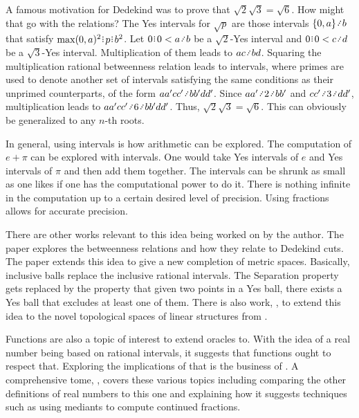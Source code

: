 \documentclass[12pt]{article}
\begin{document}
A famous motivation for Dedekind was to prove that $\sqrt{2} \sqrt{3} = \sqrt{6}$. How might that go with the relations? The Yes intervals for $\sqrt{p}$ are those intervals $\{0, a\} \lte b$ that satisfy $\max(0,a)^2 \rint  p \rint  b^2$. Let $0\rint 0 < a \lte b$ be a $\sqrt{2}$-Yes interval and $0\rint 0 < c\lte d$ be a $\sqrt{3}$-Yes interval. Multiplication of them leads to $ac \lte bd$. Squaring the multiplication rational betweenness relation leads to intervals, where primes are used to denote another set of intervals satisfying the same conditions as their unprimed counterparts,  of the form $aa' cc' \lte bb' dd'$. Since $aa' \lte 2 \lte bb'$ and $cc' \lte 3 \lte dd'$, multiplication leads to $aa' cc' \lte 6 \lte bb' dd'$. Thus, $\sqrt{2} \sqrt{3} = \sqrt{6}$. This can obviously be generalized to any $n$-th roots. 

In general, using intervals is how arithmetic can be explored. The computation of $e + \pi$ can be explored with intervals. One would take Yes intervals of $e$ and Yes intervals of $\pi$ and then add them together. The intervals can be shrunk as small as one likes if one has the computational power to do it. There is nothing infinite in the computation up to a certain desired level of precision. Using fractions allows for accurate precision. 

There are other works relevant to this idea being worked on by the author. The paper \cite{taylor24dedekind} explores the betweenness relations and how they relate to Dedekind cuts. The paper \cite{taylor23metric} extends this idea to give a new completion of metric spaces. Basically, inclusive balls replace the inclusive rational intervals. The Separation property gets replaced by the property that given two points in a Yes ball, there exists a Yes ball that excludes at least one of them. There is also work, \cite{taylor23maudlin}, to extend this idea to the novel topological spaces of linear structures from \cite{maudlin}. 

Functions are also a topic of interest to extend oracles to. With the idea of a real number being based on rational intervals, it suggests that functions ought to respect that. Exploring the implications of that is the business of \cite{taylor23funora}. A comprehensive tome, \cite{taylor23main}, covers these various topics including comparing the other definitions of real numbers to this one and explaining how it suggests techniques such as using mediants to compute continued fractions. 

\medskip

\normalem %


\printbibliography
\end{document}
